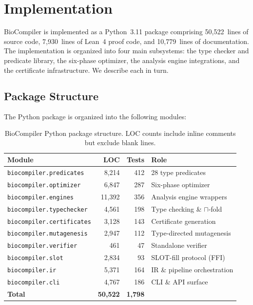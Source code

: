 
\section{Implementation}\label{sec:impl}

BioCompiler is implemented as a Python~3.11 package comprising
50,522~lines of source code, 7,930~lines of Lean~4 proof code, and
10,779~lines of documentation.  The implementation is organized into four
main subsystems: the type checker and predicate library, the six-phase
optimizer, the analysis engine integrations, and the certificate
infrastructure.  We describe each in turn.

\subsection{Package Structure}\label{sec:package}

The Python package is organized into the following modules:

\begin{table}[t]
\centering
\caption{BioCompiler Python package structure. LOC counts include
         inline comments but exclude blank lines.}
\label{tab:packageloc}
\begin{tabular}{lrrp{3.8cm}}
\toprule
\textbf{Module} & \textbf{LOC} & \textbf{Tests} & \textbf{Role} \\
\midrule
\texttt{biocompiler.predicates}  & 8,214  & 412 & 28 type predicates \\
\texttt{biocompiler.optimizer}   & 6,847  & 287 & Six-phase optimizer \\
\texttt{biocompiler.engines}     & 11,392 & 356 & Analysis engine wrappers \\
\texttt{biocompiler.typechecker} & 4,561  & 198 & Type checking \& $\sqcap$-fold \\
\texttt{biocompiler.certificates}& 3,128  & 143 & Certificate generation \\
\texttt{biocompiler.mutagenesis} & 2,947  & 112 & Type-directed mutagenesis \\
\texttt{biocompiler.verifier}    &    461  &  47 & Standalone verifier \\
\texttt{biocompiler.slot}        & 2,834  &  93 & SLOT-fill protocol (FFI) \\
\texttt{biocompiler.ir}          & 5,371  & 164 & IR \& pipeline orchestration \\
\texttt{biocompiler.cli}         & 4,767  & 186 & CLI \& API surface \\
\midrule
\textbf{Total}                   & \textbf{50,522} & \textbf{1,798} & \\
\bottomrule
\end{tabular}
\end{table}

